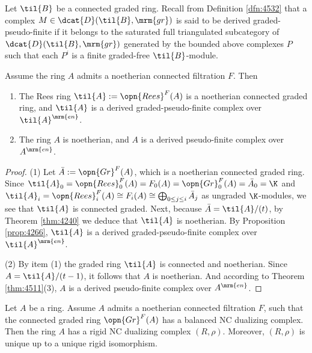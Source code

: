 Let $\til{B}$ be a connected graded ring. Recall from Definition \ref{dfn:4532} 
that a complex $M \in \dcat{D}(\til{B}, \mrm{gr})$ is said to be 
derived graded-pseudo-finite if it belongs to the saturated full 
triangulated subcategory of $\dcat{D}(\til{B}, \mrm{gr})$
generated by the bounded above complexes $P$ such that each $P^i$ is a 
finite graded-free $\til{B}$-module. 

\begin{prop} \label{prop:4395}
Assume the ring $A$ admits a noetherian connected filtration $F$. Then\tup{:}
\begin{enumerate}
\item The Rees ring $\til{A} := \opn{Rees}^F(A)$ is a noetherian connected 
graded ring, and $\til{A}$ is a derived graded-pseudo-finite complex  
over $\til{A}^{\mrm{en}}$.

\item The ring $A$ is noetherian, and $A$ is a derived pseudo-finite complex 
over $A^{\mrm{en}}$.
\end{enumerate}
\end{prop}

\begin{proof} \mbox{}

\smallskip \noindent 
(1) Let $\bar{A} := \opn{Gr}^F(A)$, which is a noetherian connected 
graded ring. Since 
$\til{A}_0 = \opn{Rees}^F_0(A) = F_0(A) = \opn{Gr}^F_0(A) = \bar{A}_0 = \K$
and 
$\til{A}_i = \opn{Rees}^F_i(A) \cong F_i(A) \cong 
\bigoplus_{0 \leq j \leq i} \bar{A}_j$ 
as ungraded $\K$-modules, we see that $\til{A}$ is connected graded. 
Next, because $\bar{A} = \til{A} / (t)$, by Theorem \ref{thm:4240} we deduce 
that $\til{A}$ is noetherian. 
By Proposition \ref{prop:4266}, $\til{A}$ is a derived graded-pseudo-finite
complex over $\til{A}^{\mrm{en}}$.

\medskip \noindent 
(2) By item (1)  the graded ring $\til{A}$ is connected and noetherian. 
Since $A = \til{A} / (t - 1)$, it follows that $A$ is noetherian. And according 
to Theorem \ref{thm:4511}(3), $A$ is a derived pseudo-finite complex over 
$A^{\mrm{en}}$.  
\end{proof}

\begin{thm} \label{thm:4396}
Let $A$ be a ring. Assume $A$ admits a noetherian connected filtration 
$F$, such that the connected graded ring 
$\opn{Gr}^F(A)$ has a balanced NC dualizing complex.
Then the ring $A$ has a rigid NC dualizing complex $(R, \rho)$. Moreover, 
$(R, \rho)$ is unique up to a unique rigid isomorphism.
\end{thm}

